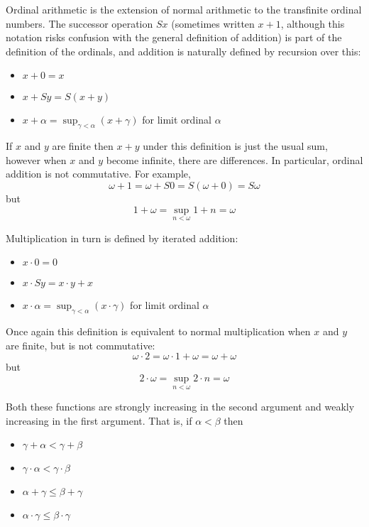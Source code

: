 \documentclass[12pt]{article}
\begin{document}
Ordinal arithmetic is the extension of normal arithmetic to the transfinite ordinal numbers.  The successor operation $Sx$ (sometimes written $x+1$, although this notation risks confusion with the general definition of addition) is part of the definition of the ordinals, and addition is naturally defined by recursion over this:

\begin{itemize}
\item $x+0=x$
\item $x+Sy=S(x+y)$
\item $x+\alpha=\operatorname{sup}_{\gamma<\alpha} (x+\gamma)$ for limit ordinal $\alpha$
\end{itemize}

If $x$ and $y$ are finite then $x+y$ under this definition is just the usual sum, however when $x$ and $y$ become infinite, there are differences.  In particular, ordinal addition is not commutative.  For example, 
$$\omega+1=\omega+S0=S(\omega+0)=S\omega$$
but
$$1+\omega=\operatorname{sup}_{n<\omega} 1+n=\omega$$

Multiplication in turn is defined by iterated addition:

\begin{itemize}
\item $x\cdot 0=0$
\item $x\cdot Sy=x\cdot y+x$
\item $x\cdot \alpha=\operatorname{sup}_{\gamma<\alpha} (x\cdot \gamma)$ for limit ordinal $\alpha$
\end{itemize}

Once again this definition is equivalent to normal multiplication when $x$ and $y$ are finite, but is not commutative:
$$\omega\cdot 2=\omega\cdot 1+\omega=\omega+\omega$$
but
$$2\cdot\omega=\operatorname{sup}_{n<\omega} 2\cdot n=\omega$$

Both these functions are strongly increasing in the second argument and weakly increasing in the first argument.  That is, if $\alpha<\beta$ then 
\begin{itemize}
\item $\gamma+\alpha<\gamma+\beta$
\item $\gamma\cdot\alpha<\gamma\cdot\beta$
\item $\alpha+\gamma\leq\beta+\gamma$
\item $\alpha\cdot\gamma\leq\beta\cdot\gamma$
\end{itemize}
\end{document}
